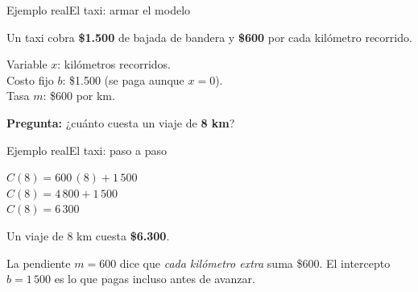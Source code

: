 \documentclass[12pt]{article}
\begin{document}
\begin{mwmodlamina}[mwprimario]{Ejemplo real}{El taxi: armar el modelo}
\begin{mwcajapaso}
  {\mwsmall
  Un taxi cobra \textbf{\$1.500} de bajada de bandera y
  \textbf{\$600} por cada kilómetro recorrido.}
\end{mwcajapaso}

\begin{mwcaja}
  {\mwsmall
  Variable $x$: kilómetros recorridos.\\[3pt]
  Costo fijo $b$: \$1.500 (se paga aunque $x=0$).\\[3pt]
  Tasa $m$: \$600 por km.}
\end{mwcaja}

\begin{mwcajaformula}
\end{mwcajaformula}

\begin{mwcajaalerta}
  {\mwsmall \textbf{Pregunta:} ¿cuánto cuesta un viaje de
  \textbf{8 km}?}
\end{mwcajaalerta}
\end{mwmodlamina}

\begin{mwmodlamina}[mwmagenta]{Ejemplo real}{El taxi: paso a paso}
\begin{mwcajapaso}
  $C(8)=600\,(8)+1\,500$\\[3pt]
  $C(8)=4\,800+1\,500$\\[3pt]
  $C(8)=6\,300$
\end{mwcajapaso}

\begin{mwcajaok}
  {\nxheav\fontsize{12}{14}\selectfont
  Un viaje de 8 km cuesta \textbf{\$6.300}.}
\end{mwcajaok}

\begin{mwcaja}
  {\mwsmall La pendiente $m=600$ dice que \emph{cada kilómetro
  extra} suma \$600. El intercepto $b=1\,500$ es lo que pagas
  incluso antes de avanzar.}
\end{mwcaja}
\end{mwmodlamina}
\end{document}
